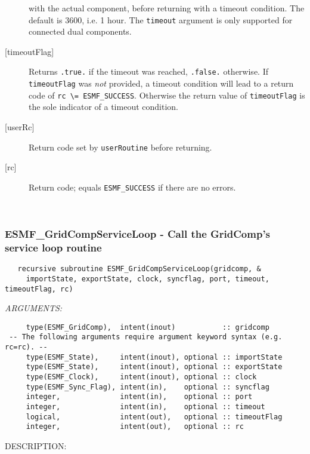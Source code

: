 \begin{description}
     with the actual component, before returning with a timeout condition.
     The default is 3600, i.e. 1 hour. The {\tt timeout} argument is only
     supported for connected dual components.
   \item[{[timeoutFlag]}]
     Returns {\tt .true.} if the timeout was reached, {\tt .false.} otherwise.
     If {\tt timeoutFlag} was {\em not} provided, a timeout condition will lead
     to a return code of {\tt rc \textbackslash = ESMF\_SUCCESS}. Otherwise the
     return value of {\tt timeoutFlag} is the sole indicator of a timeout
     condition.
   \item[{[userRc]}]
     Return code set by {\tt userRoutine} before returning.
   \item[{[rc]}]
     Return code; equals {\tt ESMF\_SUCCESS} if there are no errors.
   \end{description}
   
 
\mbox{}\hrulefill\ 
 
\subsubsection [ESMF\_GridCompServiceLoop] {ESMF\_GridCompServiceLoop - Call the GridComp's service loop routine}


 
\begin{verbatim}   recursive subroutine ESMF_GridCompServiceLoop(gridcomp, &
     importState, exportState, clock, syncflag, port, timeout, timeoutFlag, rc)\end{verbatim}{\em ARGUMENTS:}
\begin{verbatim}     type(ESMF_GridComp),  intent(inout)           :: gridcomp
 -- The following arguments require argument keyword syntax (e.g. rc=rc). --
     type(ESMF_State),     intent(inout), optional :: importState
     type(ESMF_State),     intent(inout), optional :: exportState
     type(ESMF_Clock),     intent(inout), optional :: clock
     type(ESMF_Sync_Flag), intent(in),    optional :: syncflag
     integer,              intent(in),    optional :: port
     integer,              intent(in),    optional :: timeout
     logical,              intent(out),   optional :: timeoutFlag
     integer,              intent(out),   optional :: rc\end{verbatim}
{\sf DESCRIPTION:\\ }


